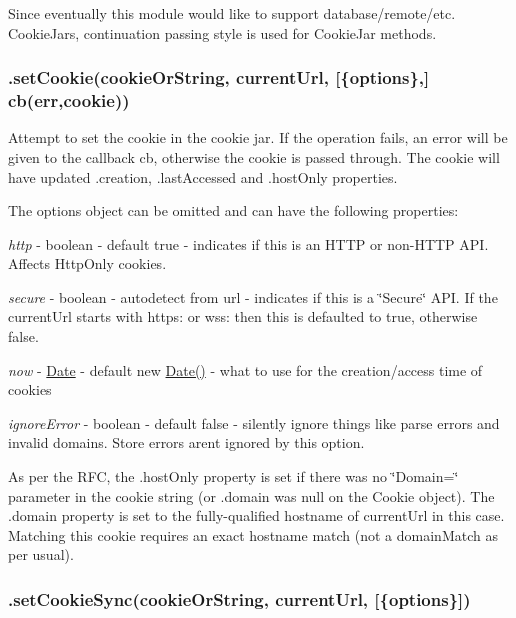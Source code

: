 Since eventually this module would like to support database/remote/etc. Cookie\+Jars, continuation passing style is used for Cookie\+Jar methods.

\subsubsection*{{\ttfamily .set\+Cookie(cookie\+Or\+String, current\+Url, \mbox{[}\{options\},\mbox{]} cb(err,cookie))}}

Attempt to set the cookie in the cookie jar. If the operation fails, an error will be given to the callback {\ttfamily cb}, otherwise the cookie is passed through. The cookie will have updated {\ttfamily .creation}, {\ttfamily .last\+Accessed} and {\ttfamily .host\+Only} properties.

The {\ttfamily options} object can be omitted and can have the following properties\+:


\begin{DoxyItemize}
\item {\itshape http} -\/ boolean -\/ default {\ttfamily true} -\/ indicates if this is an H\+T\+TP or non-\/\+H\+T\+TP A\+PI. Affects Http\+Only cookies.
\item {\itshape secure} -\/ boolean -\/ autodetect from url -\/ indicates if this is a \char`\"{}\+Secure\char`\"{} A\+PI. If the current\+Url starts with {\ttfamily https\+:} or {\ttfamily wss\+:} then this is defaulted to {\ttfamily true}, otherwise {\ttfamily false}.
\item {\itshape now} -\/ \mbox{\hyperlink{classDate}{Date}} -\/ default {\ttfamily new \mbox{\hyperlink{classDate}{Date()}}} -\/ what to use for the creation/access time of cookies
\item {\itshape ignore\+Error} -\/ boolean -\/ default {\ttfamily false} -\/ silently ignore things like parse errors and invalid domains. {\ttfamily Store} errors aren\textquotesingle{}t ignored by this option.
\end{DoxyItemize}

As per the R\+FC, the {\ttfamily .host\+Only} property is set if there was no \char`\"{}\+Domain=\char`\"{} parameter in the cookie string (or {\ttfamily .domain} was null on the Cookie object). The {\ttfamily .domain} property is set to the fully-\/qualified hostname of {\ttfamily current\+Url} in this case. Matching this cookie requires an exact hostname match (not a {\ttfamily domain\+Match} as per usual).

\subsubsection*{{\ttfamily .set\+Cookie\+Sync(cookie\+Or\+String, current\+Url, \mbox{[}\{options\}\mbox{]})}}

